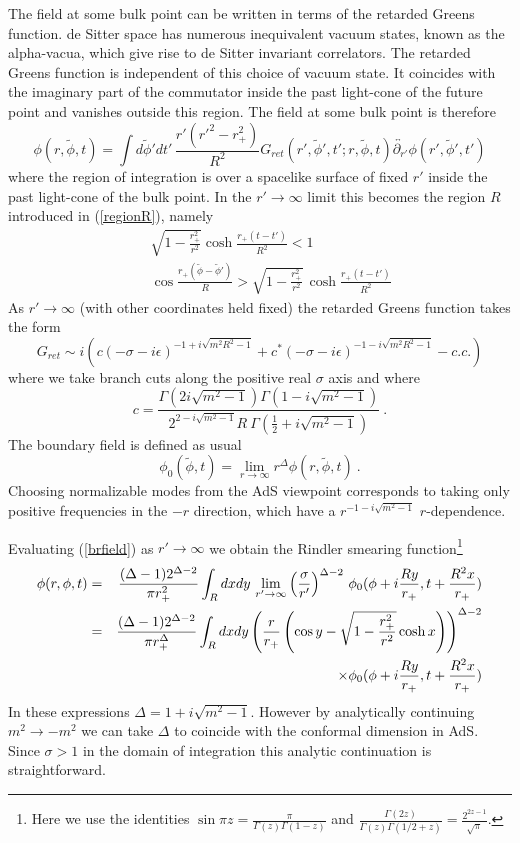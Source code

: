 \documentclass[12pt]{article}
\newcommand{\be}{\begin{equation}}
\newcommand{\ee}{\end{equation}}
\newcommand{\bea}{\begin{eqnarray}}
\newcommand{\eea}{\end{eqnarray}}
\begin{document}
The field at some bulk point can be written in terms of the retarded
Greens function.  de Sitter space has numerous inequivalent vacuum
states, known as the alpha-vacua, which give rise to de Sitter
invariant correlators. The retarded Greens function is independent of
this choice of vacuum state.  It coincides with the imaginary part of
the commutator inside the past light-cone of the future point and
vanishes outside this region.  The field at some bulk point is
therefore
%
\be
\phi(r,\tilde{\phi},t)=\int d\tilde{\phi}'dt'\,\frac{r'(r'^{2}-r_{+}^{2})}{R^{2}}G_{ret}(r',\tilde{\phi}',t';r,\tilde{\phi},t)
\overleftrightarrow{\partial_{r'}}\phi(r',\tilde{\phi}',t') \label{brfield}
\ee
%
where the region of integration is over a spacelike surface of fixed
$r'$ inside the past light-cone of the bulk point.  In the $r' \rightarrow \infty$
limit this becomes the region $R$ introduced in (\ref{regionR}), namely
%
\bea
\label{plc}
&& \sqrt{1 - \frac{r_+^2}{r^2}} \cosh \frac{r_+( t-t')}{R^2} < 1 \\
\nonumber
&& \cos \frac{r_+( \tilde \phi-\tilde \phi')}{R} > \sqrt{1 - \frac{r_+^2}{r^2}} \, \cosh \frac{r_+( t-t')}{R^2}
\eea
As $r'\to\infty$ (with other coordinates held fixed) the retarded
Greens function takes the form \cite{Bousso:2001mw}
\[
G_{ret}\sim i\left( c\left(-\sigma -i\epsilon\right)^{-1+i
\sqrt{m^{2}R^2-1}}+c^* \left(-\sigma-i\epsilon\right)^{-1-i
\sqrt{m^{2}R^2-1}}-c.c.\right)
\]
where we take branch cuts along the positive real $\sigma$ axis and where
\[
 c=  \frac{\Gamma(2 i\sqrt{m^2-1}) \Gamma(1-i\sqrt{m^2-1}) }{2^{2-i
\sqrt{m^2-1}} R~ \Gamma(\frac{1}{2}+i\sqrt{m^2-1} ) }~. 
\]
The boundary field is defined as usual
\begin{equation}
\phi_{0}(\tilde{\phi},t)=\lim_{r\to\infty}r^{\Delta}\phi(r,\tilde{\phi},t)~.\label{eq:bfield}
\end{equation}
Choosing normalizable modes from the AdS viewpoint corresponds to
taking only positive frequencies in the $-r$ direction, which have a
$r^{-1-i\sqrt{m^2-1}}$ $r$-dependence.

Evaluating (\ref{brfield}) as $r' \to \infty$ we obtain the Rindler
smearing function\footnote{Here we use the identities $\sin\pi z =
\frac{\pi}{\Gamma(z)\Gamma(1-z)}$ and
$\frac{\Gamma(2z)}{\Gamma(z)\Gamma(1/2+z)}=\frac{2^{2z-1}}{\sqrt{\pi}}$.}
%
\bea
\nonumber
\phi(r,\phi,t) & = & {(\Delta - 1) 2^{\Delta - 2} \over \pi r_+^2} \int_R dx dy \,
\lim_{r' \rightarrow \infty} \left({\sigma \over r'}\right)^{\Delta - 2} \,
\phi_0(\phi + i{Ry \over r_+},t + {R^2 x \over r_+}) \\
& = & \frac{(\Delta-1)2^{\Delta-2}}{\pi r_{+}^{\Delta} }\int_{R}dx dy\left(\frac{r}{r_{+}}
\left(\cos y-\sqrt{1-\frac{r_{+}^{2}}{r^{2}}}\cosh x\right)\right)^{\Delta-2} \nonumber \\ 
&& \qquad\qquad \times \phi_{0}(\phi+i\frac{Ry}{r_+},t+\frac{R^2 x}{r_+})
\label{finalanswer}
\eea
%
In these expressions $\Delta=1+i\sqrt{m^2-1}$.  However by
analytically continuing $m^{2}\to-m^{2}$ we can take $\Delta$ to
coincide with the conformal dimension in AdS.  Since $\sigma>1$ in the
domain of integration this analytic continuation is straightforward.
\end{document}
